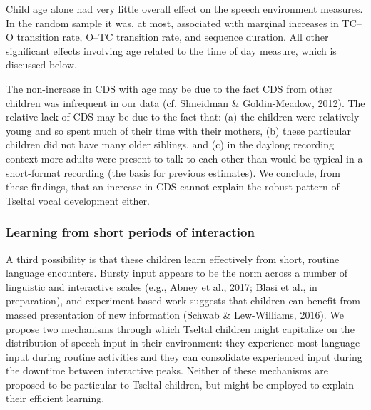 \documentclass[floatsintext,man]{apa6}
\theoremstyle{definition}
\theoremstyle{definition}
\theoremstyle{definition}
\theoremstyle{remark}
\begin{document}
Child age alone had very little overall effect on the speech environment
measures. In the random sample it was, at most, associated with marginal
increases in TC--O transition rate, O--TC transition rate, and sequence
duration. All other significant effects involving age related to the
time of day measure, which is discussed below.

The non-increase in CDS with age may be due to the fact CDS from other
children was infrequent in our data (cf. Shneidman \& Goldin-Meadow,
2012). The relative lack of CDS may be due to the fact that: (a) the
children were relatively young and so spent much of their time with
their mothers, (b) these particular children did not have many older
siblings, and (c) in the daylong recording context more adults were
present to talk to each other than would be typical in a short-format
recording (the basis for previous estimates). We conclude, from these
findings, that an increase in CDS cannot explain the robust pattern of
Tseltal vocal development either.

\subsubsection{Learning from short periods of
interaction}\label{learning-from-short-periods-of-interaction}

A third possibility is that these children learn effectively from short,
routine language encounters. Bursty input appears to be the norm across
a number of linguistic and interactive scales (e.g., Abney et al., 2017;
Blasi et al., in preparation), and experiment-based work suggests that
children can benefit from massed presentation of new information (Schwab
\& Lew-Williams, 2016). We propose two mechanisms through which Tseltal
children might capitalize on the distribution of speech input in their
environment: they experience most language input during routine
activities and they can consolidate experienced input during the
downtime between interactive peaks. Neither of these mechanisms are
proposed to be particular to Tseltal children, but might be employed to
explain their efficient learning.
\end{document}
